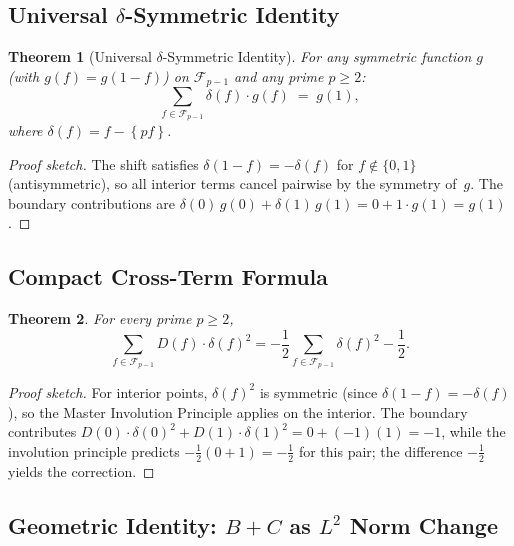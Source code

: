 \documentclass[11pt]{article}
\newtheorem{theorem}{Theorem}[section]
\theoremstyle{definition}
\newcommand{\F}{\mathcal{F}}
\newcommand{\fpart}[1]{\left\{#1\right\}}
\begin{document}
\subsection{Universal $\delta$-Symmetric Identity}

\begin{theorem}[Universal $\delta$-Symmetric Identity]\label{thm:delta-sym}
For any symmetric function $g$ (with $g(f) = g(1-f)$) on $\F_{p-1}$
and any prime $p \ge 2$:
\begin{equation}\label{eq:delta-sym}
  \sum_{f \in \F_{p-1}} \delta(f) \cdot g(f) \;=\; g(1),
\end{equation}
where $\delta(f) = f - \fpart{pf}$.
\end{theorem}

\begin{proof}[Proof sketch]
The shift satisfies $\delta(1-f) = -\delta(f)$ for
$f \notin \{0,1\}$ (antisymmetric), so all interior terms
cancel pairwise by the symmetry of~$g$.  The boundary
contributions are $\delta(0)\,g(0) + \delta(1)\,g(1) =
0 + 1 \cdot g(1) = g(1)$.
\end{proof}

\subsection{Compact Cross-Term Formula}

\begin{theorem}\label{thm:cross-term}
For every prime $p \ge 2$,
\begin{equation}\label{eq:cross-term}
  \sum_{f \in \F_{p-1}} D(f) \cdot \delta(f)^2
  = -\frac{1}{2}\sum_{f \in \F_{p-1}} \delta(f)^2 - \frac{1}{2}.
\end{equation}
\end{theorem}

\begin{proof}[Proof sketch]
For interior points, $\delta(f)^2$ is symmetric (since
$\delta(1-f) = -\delta(f)$), so the Master Involution Principle
applies on the interior.  The boundary contributes
$D(0) \cdot \delta(0)^2 + D(1) \cdot \delta(1)^2 = 0 + (-1)(1) = -1$,
while the involution principle predicts $-\tfrac{1}{2}(0 + 1) = -\tfrac{1}{2}$
for this pair; the difference $-\tfrac{1}{2}$ yields the correction.
\end{proof}


\subsection{Geometric Identity: $B+C$ as $L^2$ Norm Change}
\end{document}
